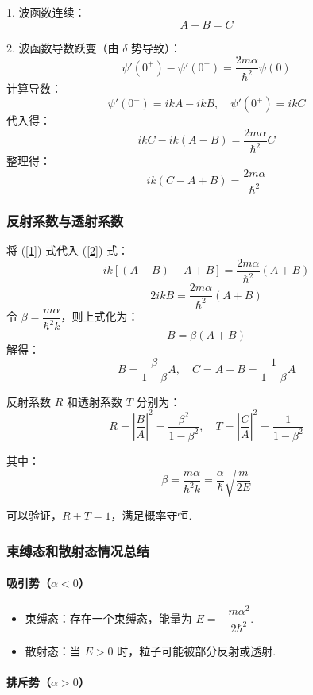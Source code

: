 1. 波函数连续：
\begin{equation}
	A + B = C \label{1}
\end{equation}

2. 波函数导数跃变（由 \(\delta\) 势导致）：
\[
\psi'(0^+) - \psi'(0^-) = \frac{2m\alpha}{\hbar^2} \psi(0)
\]
计算导数：
\[
\psi'(0^-) = ikA - ikB, \quad \psi'(0^+) = ikC
\]
代入得：
\[
ikC - ik(A - B) = \frac{2m\alpha}{\hbar^2} C
\]
整理得：
\begin{equation}
	ik(C - A + B) = \frac{2m\alpha}{\hbar^2} \label{2}
\end{equation}

\subsubsection{反射系数与透射系数}

将 (\ref{1}) 式代入 (\ref{2}) 式：
\[
ik[(A+B) - A + B] = \frac{2m\alpha}{\hbar^2} (A+B)
\]
\[
2ikB = \frac{2m\alpha}{\hbar^2} (A+B)
\]
令 \(\beta = \dfrac{m\alpha}{\hbar^2 k}\)，则上式化为：
\[
B = \beta (A+B)
\]
解得：
\[
B = \frac{\beta}{1-\beta} A, \quad C = A+B = \frac{1}{1-\beta} A
\]

反射系数 \(R\) 和透射系数 \(T\) 分别为：
\[
R = \left|\frac{B}{A}\right|^2 = \frac{ \beta ^2}{ 1-\beta ^2}, \quad T = \left| \frac{C}{A} \right|^2 = \frac{1}{ 1-\beta ^2}
\]

其中：
\[
\beta = \frac{m\alpha}{\hbar^2 k} = \frac{\alpha}{\hbar} \sqrt{\frac{m}{2E}}
\]

可以验证，\(R + T = 1\)，满足概率守恒.

\subsubsection{束缚态和散射态情况总结}

\paragraph*{吸引势（\(\alpha<0\)）}

\begin{itemize}
	\item 束缚态：存在一个束缚态，能量为 \(E = -\dfrac{m\alpha^2}{2\hbar^2}\).
	\item 散射态：当 \(E>0\) 时，粒子可能被部分反射或透射.
\end{itemize}

\paragraph*{排斥势（\(\alpha>0\)）}

